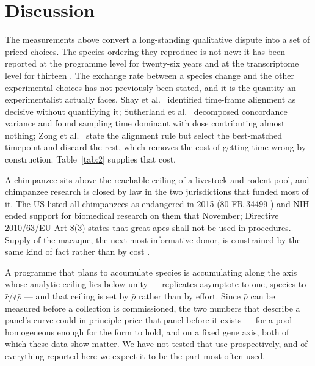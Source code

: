 \documentclass[11pt,a4paper]{article}
\begin{document}
\section{Discussion}\label{discussion}

The measurements above convert a long-standing qualitative dispute into
a set of priced choices. The species ordering they reproduce is not new:
it has been reported at the programme level for twenty-six years
\cite{ref5,ref6,ref7} and at the transcriptome level for thirteen \cite{ref1}. The
exchange rate between a species change and the other experimental
choices has not previously been stated, and it is the quantity an
experimentalist actually faces. Shay et al.~\cite{ref3} identified
time-frame alignment as decisive without quantifying it; Sutherland et
al.~\cite{ref13} decomposed concordance variance and found sampling time
dominant with dose contributing almost nothing; Zong et al.~\cite{ref12}
state the alignment rule but select the best-matched timepoint and
discard the rest, which removes the cost of getting time wrong by
construction. Table~\ref{tab:2} supplies that cost.

A chimpanzee sits above the reachable ceiling of a livestock-and-rodent
pool, and chimpanzee research is closed by law in the two jurisdictions
that funded most of it. The US listed all chimpanzees as endangered in
2015 (80 FR 34499 \cite{ref25}) and NIH ended support for biomedical
research on them that November; Directive 2010/63/EU Art 8(3) \cite{ref26}
states that great apes shall not be used in procedures. Supply of the
macaque, the next most informative donor, is constrained by the same
kind of fact rather than by cost \cite{ref27}.

A programme that plans to accumulate species is accumulating along the
axis whose analytic ceiling lies below unity --- replicates asymptote to
one, species to \ensuremath{\bar{r}}/√\ensuremath{\bar{\rho}} --- and that ceiling is set by \ensuremath{\bar{\rho}} rather than by
effort. Since \ensuremath{\bar{\rho}} can be measured before a collection is commissioned, the
two numbers that describe a panel's curve could in principle price that
panel before it exists --- for a pool homogeneous enough for the form to
hold, and on a fixed gene axis, both of which these data show matter. We
have not tested that use prospectively, and of everything reported here
we expect it to be the part most often used.
\end{document}
